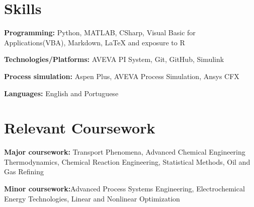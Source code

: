 \documentclass[letterpaper,11pt]{article}
\newcommand{\resumeSubHeadingListStart}{\begin{itemize}[leftmargin=0.15in, label={}]}
\newcommand{\resumeSubHeadingListEnd}{\end{itemize}}
\begin{document}

\section{Skills}
  \vspace{2pt}
  \resumeSubHeadingListStart
    \small{\item{
        \textbf{Programming:}{ Python, MATLAB, CSharp, Visual Basic for Applications(VBA), Markdown, LaTeX and exposure to R} \\ \vspace{3pt}
        
        \textbf{Technologies/Platforms:}{ AVEVA PI System, Git, GitHub, Simulink} \\ \vspace{3pt}

        \textbf{Process simulation:}{ Aspen Plus, AVEVA Process Simulation, Ansys CFX} \\ \vspace{3pt}
        
        \textbf{Languages:}{ English and Portuguese}
        
    }}
  \resumeSubHeadingListEnd




\section{Relevant Coursework}
  \vspace{2pt}
  \resumeSubHeadingListStart
    \small{\item{
        \textbf{Major coursework:}{ Transport Phenomena, Advanced Chemical Engineering Thermodynamics, Chemical Reaction Engineering, Statistical Methods, Oil and Gas Refining} \\ \vspace{3pt}
        
        \textbf{Minor coursework:}{Advanced Process Systems Engineering, Electrochemical Energy Technologies,  Linear and Nonlinear Optimization}
    }}
  \resumeSubHeadingListEnd
\end{document}
